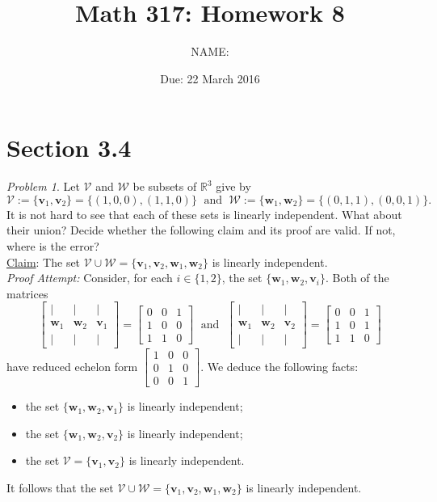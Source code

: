 \documentclass[fleqn,11pt]{paper}
\author         {NAME:                     }
\title{Math 317: Homework 8}
\date{Due: 22 March 2016}
\theoremstyle{remark}
\newtheorem{problem}{Problem}
\newtheorem*{solution}{{\bf Solution}}
\newcommand\R{\fld{R}}
\renewcommand{\vec}[1]{\mathbf{#1}}
\newcommand{\<}{\ensuremath{\langle}}
\renewcommand{\>}{\ensuremath{\rangle}}
\newcommand\fld[1]{\ensuremath{\mathbb{#1}}}
\newcommand\vv{\vec{v}}
\newcommand\vw{\vec{w}}
\newcommand\sV{\ensuremath{\mathcal V}}
\newcommand\sW{\ensuremath{\mathcal W}}
\begin{document}
\maketitle
\section*{Section 3.4}
\begin{problem}
Let $\sV$ and $\sW$ be subsets of $\R^3$ give by
\[
\sV :=\{\vv_1, \vv_2\} = \{(1,0,0), (1,1,0)\} \; \text{ and } \;
\sW := \{\vw_1, \vw_2\} =\{(0,1,1), (0,0,1)\}.
\]
It is not hard to see that each of these sets is linearly independent.  What about their union?
Decide whether the following claim and its proof are valid.  If not, where is the error?
\\[5pt]
\underline{Claim}: The set $\sV \cup \sW = \{\vv_1, \vv_2, \vw_1, \vw_2\}$ is linearly independent. \\[4pt]
{\it Proof Attempt:} Consider, for each $i\in \{1, 2\}$, the set $\{\vw_1, \vw_2, \vv_i\}$.
Both of the matrices
\[
\begin{bmatrix*}
    | & | & |\\
    \vw_1& \vw_2 & \vv_1\\
    | & | & |
  \end{bmatrix*}=
  \begin{bmatrix*}
    0  & 0 & 1\\
    1  & 0 & 0\\
    1  & 1 & 0
  \end{bmatrix*}
\; \text{ and } \;
\begin{bmatrix*}
    | & | & |\\
    \vw_1& \vw_2 & \vv_2\\
    | & | & |
  \end{bmatrix*}=
  \begin{bmatrix*}
    0  & 0 & 1\\
    1  & 0 & 1\\
    1  & 1 & 0
  \end{bmatrix*}\]
  have reduced echelon form
  $\begin{bmatrix*}
    1  & 0 & 0\\
    0  & 1 & 0\\
    0  & 0 & 1
  \end{bmatrix*}$.
We deduce the following facts:
\begin{itemize}
\item the set $\{\vw_1, \vw_2, \vv_1\}$ is linearly independent;
\item the set $\{\vw_1, \vw_2, \vv_2\}$ is linearly independent;
\item the set $\sV = \{\vv_1, \vv_2\}$ is linearly independent.
\end{itemize}
It follows that the set $\sV \cup \sW = \{\vv_1, \vv_2, \vw_1, \vw_2\}$ is linearly independent. 
\end{problem}
\end{document}
